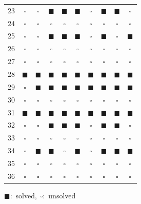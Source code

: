 \begin{table}
{\begin{minipage}[t]{0.49\linewidth}
\begin{tabular}[t]{c | c | c | c | c | c | c | c | c | c}
			23 & $\square$ & $\square$ & $\blacksquare$ & $\blacksquare$ & $\blacksquare$ & $\square$ & $\blacksquare$ & $\blacksquare$ & $\square$ \\
			24 & $\square$ & $\square$ & $\square$ & $\square$ & $\square$ & $\square$ & $\square$ & $\square$ & $\square$ \\
			25 & $\square$ & $\square$ & $\blacksquare$ & $\blacksquare$ & $\blacksquare$ & $\square$ & $\blacksquare$ & $\square$ & $\blacksquare$ \\
			26 & $\square$ & $\square$ & $\square$ & $\square$ & $\square$ & $\square$ & $\square$ & $\square$ & $\square$ \\
			27 & $\square$ & $\square$ & $\square$ & $\square$ & $\square$ & $\square$ & $\square$ & $\square$ & $\square$ \\
			28 & $\blacksquare$ & $\blacksquare$ & $\blacksquare$ & $\blacksquare$ & $\blacksquare$ & $\blacksquare$ & $\blacksquare$ & $\blacksquare$ & $\blacksquare$ \\
			29 & $\square$ & $\blacksquare$ & $\blacksquare$ & $\blacksquare$ & $\blacksquare$ & $\blacksquare$ & $\blacksquare$ & $\blacksquare$ & $\blacksquare$ \\
			30 & $\square$ & $\square$ & $\square$ & $\square$ & $\square$ & $\square$ & $\square$ & $\square$ & $\square$ \\
			31 & $\blacksquare$ & $\blacksquare$ & $\blacksquare$ & $\blacksquare$ & $\blacksquare$ & $\blacksquare$ & $\blacksquare$ & $\blacksquare$ & $\blacksquare$ \\
			32 & $\square$ & $\square$ & $\blacksquare$ & $\blacksquare$ & $\blacksquare$ & $\square$ & $\blacksquare$ & $\blacksquare$ & $\square$ \\ 
			33 & $\square$ & $\square$ & $\square$ & $\square$ & $\square$ & $\square$ & $\square$ & $\square$ & $\square$ \\
			34 & $\square$ & $\blacksquare$ & $\blacksquare$ & $\square$ & $\blacksquare$ & $\square$ & $\blacksquare$ & $\blacksquare$ & $\blacksquare$ \\
			35 & $\square$ & $\square$ & $\square$ & $\square$ & $\square$ & $\square$ & $\square$ & $\square$ & $\square$ \\
			36 & $\square$ & $\square$ & $\square$ & $\square$ & $\square$ & $\square$ & $\square$ & $\square$ & $\square$ \\
			\hline
		\end{tabular} %
	\end{minipage}
	}
	\mbox{$\blacksquare$: solved, $\square$: unsolved}
\end{table}

